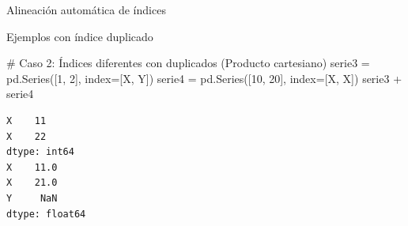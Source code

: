 \documentclass[
  ignorenonframetext,
  aspectratio=169,
  spanish,
]{beamer}
\newenvironment{Shaded}{\begin{snugshade}}{\end{snugshade}}
\newcommand{\CommentTok}[1]{\textcolor[rgb]{0.37,0.37,0.37}{#1}}
\newcommand{\DecValTok}[1]{\textcolor[rgb]{0.68,0.00,0.00}{#1}}
\newcommand{\NormalTok}[1]{\textcolor[rgb]{0.00,0.23,0.31}{#1}}
\newcommand{\OperatorTok}[1]{\textcolor[rgb]{0.37,0.37,0.37}{#1}}
\newcommand{\StringTok}[1]{\textcolor[rgb]{0.13,0.47,0.30}{#1}}
\newcommand*\circled[1]{\tikz[baseline=(char.base)]{
          \node[shape=circle,draw,inner sep=1pt] (char) {{\scriptsize#1}};}}
\begin{document}
\begin{frame}[fragile]{Alineación automática de índices}
\begin{block}{Ejemplos con índice duplicado}
\begin{Shaded}
\begin{Highlighting}[]
\CommentTok{\# Caso 2: Índices diferentes con duplicados (Producto cartesiano)}
\NormalTok{serie3 }\OperatorTok{=}\NormalTok{ pd.Series([}\DecValTok{1}\NormalTok{, }\DecValTok{2}\NormalTok{], index}\OperatorTok{=}\NormalTok{[}\StringTok{\textquotesingle{}X\textquotesingle{}}\NormalTok{, }\StringTok{\textquotesingle{}Y\textquotesingle{}}\NormalTok{])}
\NormalTok{serie4 }\OperatorTok{=}\NormalTok{ pd.Series([}\DecValTok{10}\NormalTok{, }\DecValTok{20}\NormalTok{], index}\OperatorTok{=}\NormalTok{[}\StringTok{\textquotesingle{}X\textquotesingle{}}\NormalTok{, }\StringTok{\textquotesingle{}X\textquotesingle{}}\NormalTok{])}
\NormalTok{serie3 }\OperatorTok{+}\NormalTok{ serie4 }\hspace*{\fill}\NormalTok{\circled{2}}
\end{Highlighting}
\end{Shaded}

\begin{verbatim}
X    11
X    22
dtype: int64
X    11.0
X    21.0
Y     NaN
dtype: float64
\end{verbatim}
\end{block}
\end{frame}
\end{document}
